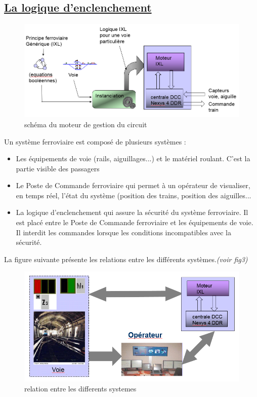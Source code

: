 \subsection{\underline{ La logique d'enclenchement}}
\label{sec:log_ixl}


\begin{figure}[ht]
\centering
\includegraphics[scale=0.30]{moteur.png}
\caption{sch\'ema du moteur de gestion du circuit}
\label{fig2}
\end{figure}

\newpage

Un système ferroviaire est compos\'e de plusieurs systèmes :
\begin{itemize}
  \item Les \'equipements de voie (rails, aiguillages...) et le mat\'eriel
    roulant. C'est la partie visible des passagers
  \item Le Poste de Commande ferroviaire qui permet à un op\'erateur de
    visualiser, en temps r\'eel, l'\'etat du système (position des trains,
    position des aiguilles...
  \item La logique d'enclenchement qui assure la s\'ecurit\'e du système
    ferroviaire. Il est plac\'e entre le Poste de Commande ferroviaire
    et les \'equipements de voie. Il interdit les commandes lorsque les
    conditions incompatibles avec la s\'ecurit\'e. 
\end{itemize}




La figure suivante pr\'esente les relations entre les diff\'erents
systèmes.\emph{(voir fig3)}

\begin{figure}[ht]
\centering
\includegraphics[scale=0.30]{sys_ferro.png}
\caption{relation entre les differents systemes}
\label{fig3}
\end{figure}


